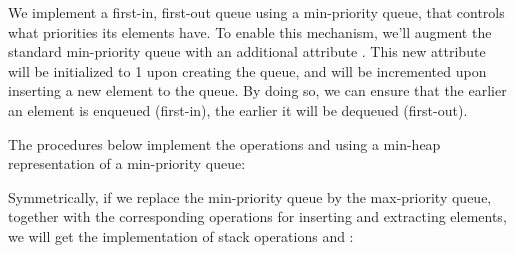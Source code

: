We implement a first-in, first-out queue using a min-priority queue, that controls what priorities its elements have.
To enable this mechanism, we'll augment the standard min-priority queue with an additional attribute .
This new attribute will be initialized to 1 upon creating the queue, and will be incremented upon inserting a new element to the queue.
By doing so, we can ensure that the earlier an element is enqueued (first-in), the earlier it will be dequeued (first-out).

The procedures below implement the operations  and  using a min-heap representation of a min-priority queue:


Symmetrically, if we replace the min-priority queue by the max-priority queue, together with the corresponding operations for inserting and extracting elements, we will get the implementation of stack operations  and :

